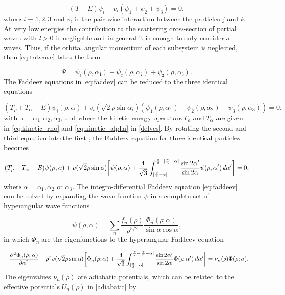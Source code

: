 \begin{equation}\label{eq:faddev}
(T-E)\psi_{i} + v_i(\psi_{1}+\psi_{2}+\psi_{3}) = 0,
\end{equation}
where $i = 1,2,3$ and $v_i$ is the pair-wise interaction between the particles $j$ and $k$. At very low energies the contribution to the scattering cross-section of partial waves with $l>0$ is negligeble and in general it is enough to only consider $s$-waves. Thus, if the orbital angular momentum of each subsystem is neglected, then \eqref{eq:totwave} takes the form 

\begin{equation}
\Psi = \psi_{1}(\rho,\alpha_1)+\psi_{2}(\rho,\alpha_2)+\psi_{3}(\rho,\alpha_3).
\end{equation}
The Faddeev equations in \eqref{eq:faddev} can be reduced to the three identical equations

\begin{equation}
(T_{\rho} + T_{\alpha} -E)\psi_{i}(\rho,\alpha) + v_i(\sqrt{2}\rho\sin \alpha_i)(\psi_{1}(\rho,\alpha_1)+\psi_{2}(\rho,\alpha_2)+\psi_{3}(\rho,\alpha_3)) = 0,
\end{equation}
with $\alpha = \alpha_1,\alpha_2,\alpha_3$, and where the kinetic energy operators $T_{\rho}$ and $T_{\alpha}$ are given in \eqref{eq:kinetic_rho} and \eqref{eq:kinetic_alpha} in \cref{delves}. By rotating the second and third equation into the first \cite{Fedorov1993}, the Faddeev equation for three identical particles becomes

\begin{equation}\label{eq:faddeev}
(T_{\rho} + T_{\alpha} -E)\psi(\rho,\alpha) + v(\sqrt{2}\rho\sin \alpha)\bigg[\psi(\rho,\alpha) + \frac{4}{\sqrt{3}} \int_{\lvert\frac{\pi}{3}-\alpha\rvert}^{\frac{\pi}{2}-\lvert\frac{\pi}{6}-\alpha\rvert} \frac{\sin 2\alpha'}{\sin 2\alpha}\psi(\rho,\alpha') \, d\alpha'\bigg] = 0,
\end{equation} 
where $\alpha = \alpha_1, \alpha_2$ or $\alpha_3$. The integro-differential Faddeev equation \eqref{eq:faddeev} can be solved by expanding the wave function $\psi$ in a complete set of hyperangular wave functions

\begin{equation}
\psi(\rho,\alpha) = \sum_{n}\frac{f_n(\rho)}{\rho^{5/2}} \frac{\Phi_n(\rho;\alpha)}{\sin \alpha \cos \alpha},
\end{equation}
in which $\Phi_n$ are the eigenfunctions to the hyperangular Faddeev equation

\begin{equation}\label{eq:faddeev_hyperang}
-\frac{\partial^2\Phi_n(\rho;\alpha)}{\partial \alpha^2} + \rho^2 v(\sqrt{2}\rho\sin \alpha)\bigg[\Phi_n(\rho;\alpha) + \frac{4}{\sqrt{3}} \int_{\lvert\frac{\pi}{3}-\alpha\rvert}^{\frac{\pi}{2}-\lvert\frac{\pi}{6}-\alpha\rvert} \frac{\sin 2\alpha'}{\sin 2\alpha}\Phi(\rho;\alpha') \, d\alpha'\bigg] = \nu_n(\rho)\Phi(\rho;\alpha).
\end{equation}
The eigenvalues $\nu_{n}(\rho)$ are adiabatic potentials, which can be related to the effective potentials $U_{n}(\rho)$ in \eqref{adiabatic} by 

